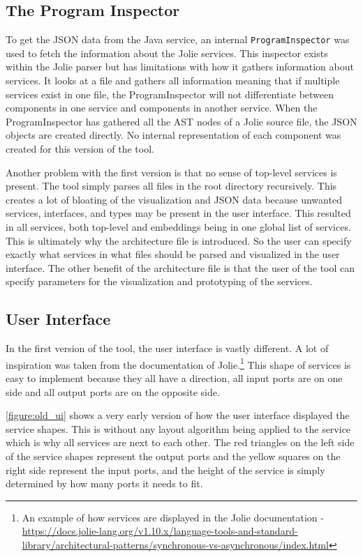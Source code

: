 \subsection{The Program Inspector}
To get the JSON data from the Java service, an internal \texttt{ProgramInspector} was used to fetch the information about the Jolie services. This inspector exists within the Jolie parser but has limitations with how it gathers information about services.
It looks at a file and gathers all information meaning that if multiple services exist in one file, the ProgramInspector will not differentiate between components in one service and components in another service.
When the ProgramInspector has gathered all the AST nodes of a Jolie source file, the JSON objects are created directly. No internal representation of each component was created for this version of the tool.

Another problem with the first version is that no sense of top-level services is present. The tool simply parses all files in the root directory recursively. This creates a lot of bloating of the visualization and JSON data because unwanted services, interfaces, and types may be present in the user interface.
This resulted in all services, both top-level and embeddings being in one global list of services.
This is ultimately why the architecture file is introduced. So the user can specify exactly what services in what files should be parsed and visualized in the user interface. The other benefit of the architecture file is that the user of the tool can specify parameters for the visualization and prototyping of the services.

\subsection{User Interface}
In the first version of the tool, the user interface is vastly different. A lot of inspiration was taken from the documentation of Jolie.\footnote{An example of how services are displayed in the Jolie documentation - \url{https://docs.jolie-lang.org/v1.10.x/language-tools-and-standard-library/architectural-patterns/synchronous-vs-asynchronous/index.html}}
This shape of services is easy to implement because they all have a direction, all input ports are on one side and all output ports are on the opposite side.

\cref{figure:old_ui} shows a very early version of how the user interface displayed the service shapes. This is without any layout algorithm being applied to the service which is why all services are next to each other.
The red triangles on the left side of the service shapes represent the output ports and the yellow squares on the right side represent the input ports, and the height of the service is simply determined by how many ports it needs to fit.

